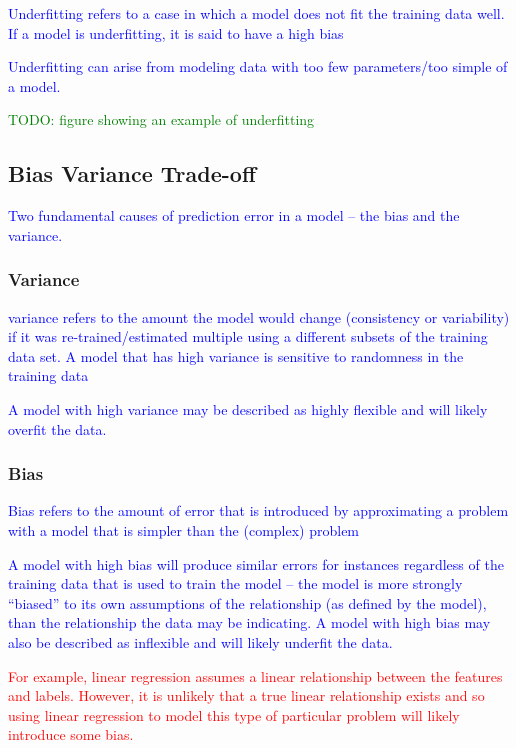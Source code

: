 \textcolor{blue}{Underfitting refers to a case in which a model does not fit the training data well. If a model is underfitting, it is said to have a high bias}

\textcolor{blue}{Underfitting can arise from modeling data with too few parameters/too simple of a model.}

\textcolor{green}{TODO: figure showing an example of underfitting}


\subsection{Bias Variance Trade-off}

\textcolor{blue}{Two fundamental causes of prediction error in a model -- the bias and the variance.}

\subsubsection{Variance}
\textcolor{blue}{variance refers to the amount the model would change (consistency or variability) if it was re-trained/estimated multiple using a different subsets of the training data set. A model that has high variance is sensitive to randomness in the training data}

\textcolor{blue}{A model with high variance may be described as highly flexible and will likely overfit the data.}


\subsubsection{Bias}
\textcolor{blue}{Bias refers to the amount of error that is introduced by approximating a problem with a model that is simpler than the (complex) problem}

\textcolor{blue}{A model with high bias will produce similar errors for instances regardless of the training data that is used to train the model -- the model is more strongly ``biased'' to its own assumptions of the relationship (as defined by the model), than the relationship the data may be indicating. A model with high bias may also be described as inflexible and will likely underfit the data.}


\textcolor{red}{For example, linear regression assumes a linear relationship between the features and labels. However, it is unlikely that a true linear relationship exists and so using linear regression to model this type of particular problem will likely introduce some bias.}

